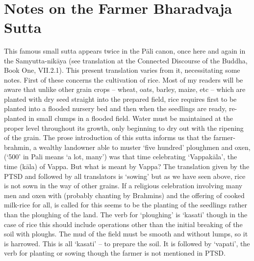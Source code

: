 \begin{MyDescription}[(SN76-82)]{}

\end{MyDescription}    
\newpage   
\section{Notes on the Farmer Bharadvaja Sutta}
   
This famous small sutta appears twice in the P\=ali canon, once here and again in the Samyutta-nik\=aya (see translation at the Connected Discourse of the Buddha, Book One, VII.2.1). This present translation varies from it, necessitating some notes.
First of these concerns the cultivation of rice. Most of my readers will be aware that unlike other grain crops – wheat, oats, barley, maize, etc – which are planted with dry seed straight into the prepared field, rice requires first to be planted into a flooded nursery bed and then when the seedlings are ready, re-planted in small clumps in a flooded field. Water must be maintained at the proper level throughout its growth, only beginning to dry out with the ripening of the grain.
The prose introduction of this sutta informs us that the farmer-brahmin, a wealthy landowner able to muster `five hundred' ploughmen and oxen, (`500' in Pali means `a lot, many') was that time celebrating `Vappak\=ala', the time (k\=ala) of Vappa. But what is meant by Vappa? The translation given by the PTSD and followed by all translators is `sowing' but as we have seen above, rice is not sown in the way of other grains. If a religious celebration involving many men and oxen with (probably chanting by Brahmins) and the offering of cooked milk-rice for all, is called for this seems to be the planting of the seedlings rather than the ploughing of the land. The verb for `ploughing' is `kasati' though in the case of rice this should include operations other than the initial breaking of the soil with ploughs. The mud of the field must be smooth and without lumps, so it is harrowed. This is all `kasati' – to prepare the soil. It is followed by `vapati', the verb for planting or sowing though the farmer is not mentioned in PTSD. 
   
